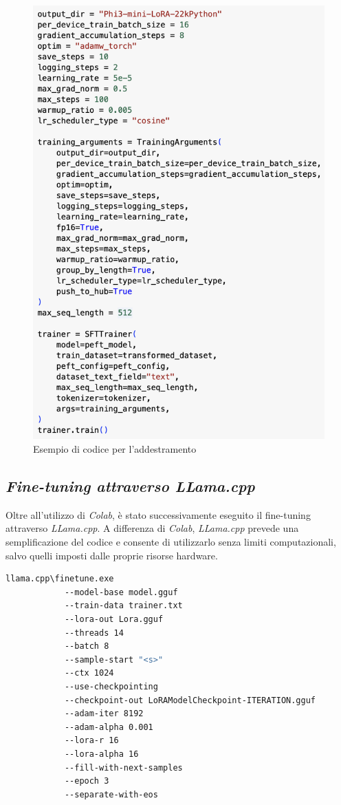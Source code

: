     \begin{figure}[htp]
        \centering        
        \includegraphics[width=12cm]{img/training.pdf}
        \caption{Esempio di codice per l'addestramento}
    \end{figure}\newpage



    \subsection{\textit{Fine-tuning attraverso LLama.cpp}}
      Oltre all'utilizzo di \textit{Colab}, è stato successivamente eseguito il \gls{fine-tuning} attraverso \textit{LLama.cpp}. A differenza di \textit{Colab}, \textit{LLama.cpp} prevede una semplificazione del codice e consente di utilizzarlo senza limiti computazionali, salvo quelli imposti dalle proprie risorse hardware.
    \begin{lstlisting}[language=bash]
        llama.cpp\finetune.exe
            --model-base model.gguf
            --train-data trainer.txt
            --lora-out Lora.gguf
            --threads 14
            --batch 8
            --sample-start "<s>"
            --ctx 1024
            --use-checkpointing
            --checkpoint-out LoRAModelCheckpoint-ITERATION.gguf
            --adam-iter 8192
            --adam-alpha 0.001
            --lora-r 16
            --lora-alpha 16
            --fill-with-next-samples
            --epoch 3
            --separate-with-eos
    \end{lstlisting}
    
